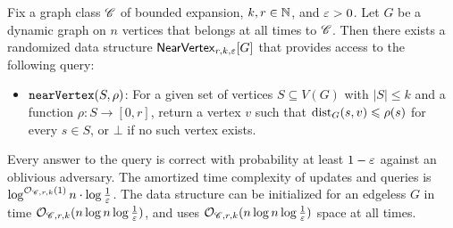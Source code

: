 \begin{theorem}\label{thm:NearVertex-new}
	Fix a graph class $\Cc$ of bounded expansion, $k,r\in \N$, and $\eps>0$.
	Let $G$ be a dynamic graph on $n$ vertices that belongs at all times to $\Cc$. Then there exists a randomized data structure $\nearVertexDS{G}{r,k,\eps}$ that provides access to the following query:
	\begin{itemize}
		\item $\near{S,\rho}$: For a given set of vertices $S\subseteq V(G)$ with $|S|\leq k$ and a function $\rho\colon S\to [0,r]$, return a vertex $v$ such that $\dist_G(s,v)\leq \rho(s)$ for every $s\in S$, or $\bot$ if no such vertex exists.
	\end{itemize}
	Every answer to the query is correct with probability at least $1-\eps$ against an oblivious adversary.
	The amortized time complexity of updates and queries is $\log^{\Oh_{\Cc,r,k}(1)} n\cdot \log \tfrac{1}{\eps}$. The data structure can be initialized for an edgeless $G$ in time $\Oh_{\Cc,r,k}(n\log n\log \tfrac{1}{\eps})$, and uses $\Oh_{\Cc,r,k}(n\log n\log \tfrac{1}{\eps})$ space at all times.
\end{theorem}
